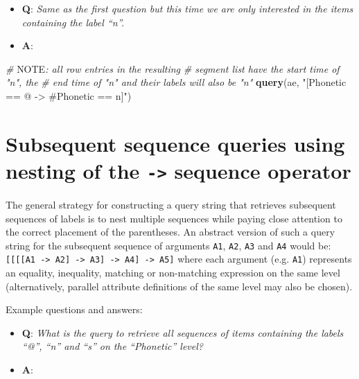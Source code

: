 \documentclass[]{book}
\newenvironment{Shaded}{\begin{snugshade}}{\end{snugshade}}
\newcommand{\AlertTok}[1]{\textcolor[rgb]{0.94,0.16,0.16}{#1}}
\newcommand{\CommentTok}[1]{\textcolor[rgb]{0.56,0.35,0.01}{\textit{#1}}}
\newcommand{\KeywordTok}[1]{\textcolor[rgb]{0.13,0.29,0.53}{\textbf{#1}}}
\newcommand{\NormalTok}[1]{#1}
\newcommand{\StringTok}[1]{\textcolor[rgb]{0.31,0.60,0.02}{#1}}
\providecommand{\tightlist}{%
  \setlength{\itemsep}{0pt}\setlength{\parskip}{0pt}}
\begin{document}
\begin{itemize}
\tightlist
\item
  \textbf{Q}: \emph{Same as the first question but this time we are only interested in the items containing the label ``n''.}
\item
  \textbf{A}:
\end{itemize}

\begin{Shaded}
\begin{Highlighting}[]
\CommentTok{# }\AlertTok{NOTE}\CommentTok{: all row entries in the resulting}
\CommentTok{# segment list have the start time of "n", the}
\CommentTok{# end time of "n" and their labels will also be "n"}
\KeywordTok{query}\NormalTok{(ae, }\StringTok{"[Phonetic == @ -> #Phonetic == n]"}\NormalTok{)}
\end{Highlighting}
\end{Shaded}

\hypertarget{subsequent-sequence-queries-using-nesting-of-the---sequence-operator}{%
\section{\texorpdfstring{Subsequent sequence queries using nesting of the \texttt{-\textgreater{}} sequence operator}{Subsequent sequence queries using nesting of the -\textgreater{} sequence operator}}\label{subsequent-sequence-queries-using-nesting-of-the---sequence-operator}}

The general strategy for constructing a query string that retrieves subsequent sequences of labels is to nest multiple sequences while paying close attention to the correct placement of the parentheses. An abstract version of such a query string for the subsequent sequence of arguments \texttt{A1}, \texttt{A2}, \texttt{A3} and \texttt{A4} would be: \texttt{{[}{[}{[}{[}A1\ -\textgreater{}\ A2{]}\ -\textgreater{}\ A3{]}\ -\textgreater{}\ A4{]}\ -\textgreater{}\ A5{]}} where each argument (e.g. \texttt{A1}) represents an equality, inequality, matching or non-matching expression on the same level (alternatively, parallel attribute definitions of the same level may also be chosen).

Example questions and answers:

\begin{itemize}
\tightlist
\item
  \textbf{Q}: \emph{What is the query to retrieve all sequences of items containing the labels ``@'', ``n'' and ``s'' on the ``Phonetic'' level?}
\item
  \textbf{A}:
\end{itemize}
\end{document}
